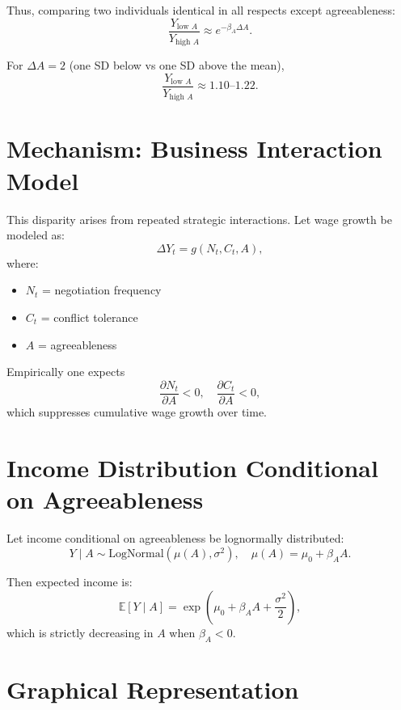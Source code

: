 \documentclass[11pt]{article}
\begin{document}
Thus, comparing two individuals identical in all respects except agreeableness:
\[
\frac{Y_{\text{low }A}}{Y_{\text{high }A}}
\approx e^{-\beta_A \Delta A}.
\]

For $\Delta A = 2$ (one SD below vs one SD above the mean),
\[
\frac{Y_{\text{low }A}}{Y_{\text{high }A}} \approx 1.10 \text{--} 1.22.
\]

\section{Mechanism: Business Interaction Model}

This disparity arises from repeated strategic interactions.
Let wage growth be modeled as:
\[
\Delta Y_t = g(N_t, C_t, A),
\]
where:
\begin{itemize}
  \item $N_t$ = negotiation frequency
  \item $C_t$ = conflict tolerance
  \item $A$ = agreeableness
\end{itemize}

Empirically one expects
\[
\frac{\partial N_t}{\partial A} < 0,
\quad
\frac{\partial C_t}{\partial A} < 0,
\]
which suppresses cumulative wage growth over time.

\section{Income Distribution Conditional on Agreeableness}

Let income conditional on agreeableness be log\-normally distributed:
\[
Y \mid A \sim \text{LogNormal}(\mu(A), \sigma^2),
\quad
\mu(A) = \mu_0 + \beta_A A.
\]

Then expected income is:
\[
\mathbb{E}[Y \mid A] = \exp\!\left(\mu_0 + \beta_A A + \frac{\sigma^2}{2}\right),
\]
which is strictly decreasing in $A$ when $\beta_A < 0$.

\section{Graphical Representation}

\begin{center}
\end{center}
\end{document}
